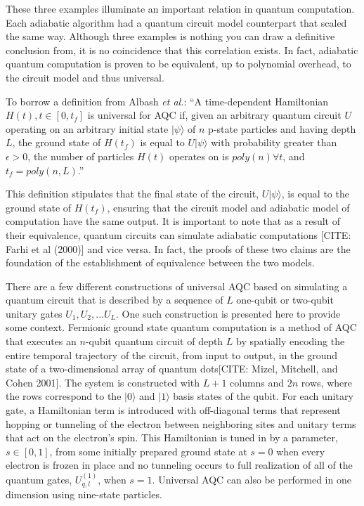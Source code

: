 \documentclass[%
 reprint,
 amsmath,amssymb,
 aps,
]{revtex4-1}
\begin{document}
   These three examples illuminate an important relation in quantum computation. Each adiabatic algorithm had a quantum circuit model counterpart that scaled the same way. Although three examples is nothing you can draw a definitive conclusion from, it is no coincidence that this correlation exists. In fact, adiabatic quantum computation is proven to be equivalent, up to polynomial overhead, to the circuit model and thus universal\cite{Aharanov2007}. 
   
   To borrow a definition from Albash \textit{et al.}: ``A time-dependent Hamiltonian $H(t), t\in [0,t_{f}]$ is universal for AQC if, given an arbitrary quantum circuit $U$ operating on an arbitrary initial state $\vert\psi\rangle$ of $n$ p-state particles and having depth $L$, the ground state of $H(t_f)$ is equal to $U\vert\psi\rangle$ with probability greater than $\epsilon>0$, the number of particles $H(t)$ operates on is $poly(n) \forall t$, and $t_f = poly(n,L)$\cite{RevModPhys.90.015002}.''
   
   This definition stipulates that the final state of the circuit, $U\vert\psi\rangle$, is equal to the ground state of $H(t_f)$, ensuring that the circuit model and adiabatic model of computation have the same output. It is important to note that as a result of their equivalence, quantum circuits can simulate adiabatic computations [CITE: Farhi et al (2000)]  and vice versa\cite{Aharanov2007}. In fact, the proofs of these two claims are the foundation of the establishment of equivalence between the two models.
   
   There are a few different constructions of universal AQC based on simulating a quantum circuit that is described by a sequence of $L$ one-qubit or two-qubit unitary gates $U_1 , U_2 , ... U_L$. One such construction is presented here to provide some context. Fermionic ground state quantum computation is a method of AQC that executes an $n$-qubit quantum circuit of depth $L$ by spatially encoding the entire temporal trajectory of the circuit, from input to output, in the ground state of a two-dimensional array of quantum dots[CITE: Mizel, Mitchell, and Cohen 2001]. The system is constructed with $L+1$ columns and $2n$ rows, where the rows correspond to the $\vert 0 \rangle$ and $\vert 1 \rangle$ basis states of the qubit. For each unitary gate, a Hamiltonian term is introduced with off-diagonal terms that represent hopping or tunneling of the electron between neighboring sites and unitary terms that act on the electron's spin. This Hamiltonian is tuned in by a parameter, $s \in [0,1]$, from some initially prepared ground state at $s=0$ when every electron is frozen in place and no tunneling occurs to full realization of all of the quantum gates, $U^{(1)}_{q,l}$, when $s=1$. Universal AQC can also be performed in one dimension using nine-state particles\cite{Aharonov2009}. 
   
\end{document}
